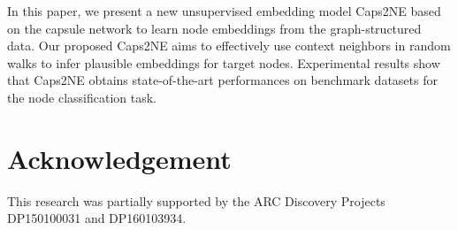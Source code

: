 \documentclass[sigconf]{acmart}
\begin{document}
In this paper, we present a new unsupervised embedding model Caps2NE based on the capsule network to learn node embeddings from the graph-structured data.
Our proposed Caps2NE aims to effectively use context neighbors in random walks to infer plausible embeddings for target nodes.
Experimental results show that Caps2NE obtains state-of-the-art performances on benchmark datasets for the node classification task.

\section*{Acknowledgement}
This research was partially supported by the ARC Discovery Projects DP150100031 and DP160103934.



\end{document}
